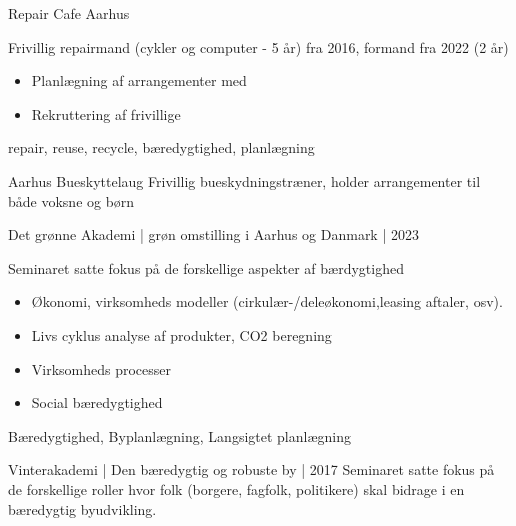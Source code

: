 %
%
%


\begin{projects}
\project
{Repair Cafe Aarhus}{}
{}
{Frivillig repairmand (cykler og computer - 5 år) fra 2016, formand fra 2022 (2 år)
\begin{itemize}
    	\item Planlægning af arrangementer med 
        \item Rekruttering af frivillige
        \end{itemize}}
{repair, reuse, recycle, bæredygtighed, planlægning}

\project
{Aarhus Bueskyttelaug}{}
{}
{Frivillig bueskydningstræner, holder arrangementer til både voksne og børn}
{}

\project
{Det grønne Akademi | grøn omstilling i Aarhus og Danmark | 2023}{}
{}
{Seminaret satte fokus på de forskellige aspekter af bærdygtighed
\begin{itemize}
    	\item Økonomi, virksomheds modeller (cirkulær-/deleøkonomi,leasing aftaler, osv).
        \item Livs cyklus analyse af produkter, CO2 beregning
        \item Virksomheds processer
        \item Social bæredygtighed
        \end{itemize}
}
{Bæredygtighed, Byplanlægning, Langsigtet planlægning}


\project
{Vinterakademi | Den bæredygtig og robuste by | 2017}{}
{}
{Seminaret satte fokus på de forskellige roller hvor folk (borgere, fagfolk, politikere) skal bidrage i en bæredygtig byudvikling.}
{}


\end{projects}
